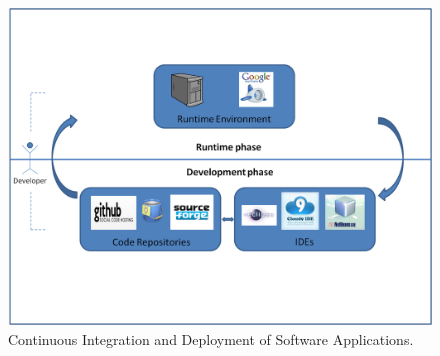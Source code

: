 \documentclass[11pt,fleqn,twoside]{article}
\begin{document}
\begin{figure}[ht!]
\begin{center}
\includegraphics[width=0.7\columnwidth]{fig/Dev_Deploy}
\end{center}
\vspace*{-4ex}
\caption{Continuous Integration and Deployment of Software Applications.}
\label{fig:dev_deploy}
\end{figure}


%
\end{document}
